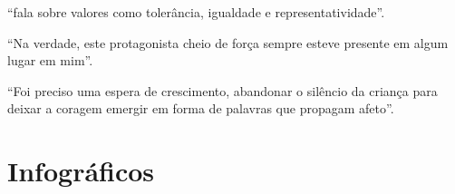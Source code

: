 \begin{conteudo}
\begin{conteudo}
\begin{conteudo}
\begin{conteudo}
\begin{escolha}
\item ``fala sobre
valores como tolerância, igualdade e representatividade''.

\item ``Na verdade, este protagonista cheio de força sempre esteve
presente em algum lugar em mim''.

\item ``Foi preciso uma espera de crescimento, abandonar o silêncio da
criança para deixar a coragem emergir em forma de palavras que propagam
afeto''.
\end{escolha}

\chapter{Infográficos}


\end{conteudo}
\end{conteudo}
\end{conteudo}
\end{conteudo}
